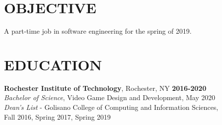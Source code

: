\documentclass[line,margin]{res}
\begin{document}

\noindent
\makebox[0pt][l]{}%
\makebox[\textwidth][c]{}%
\makebox[0pt][l]{}%
\makebox[\textwidth][c]{}%
\makebox[0pt][l]{}%
\makebox[\textwidth][c]{}%



\begin{resume}

\section{OBJECTIVE}
A part-time job in software engineering for the spring of 2019.



\section{EDUCATION}
\textbf{Rochester Institute of Technology}, Rochester, NY\hfill
    \textbf{2016-2020}\\
{\sl Bachelor of Science}, Video Game Design and Development, May 2020
\\
{\sl Dean's List} - Golisano College of Computing and Information Sciences,\hfill \\ Fall 2016, Spring 2017, Spring 2019

\end{resume}
\end{document}
